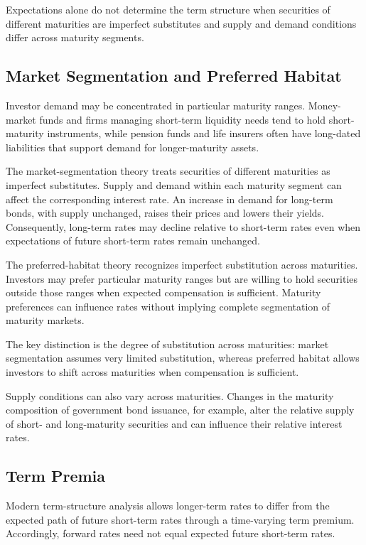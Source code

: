 Expectations alone do not determine the term structure when securities of different maturities are imperfect substitutes and supply and demand conditions differ across maturity segments.

\subsection{Market Segmentation and Preferred Habitat}

Investor demand may be concentrated in particular maturity ranges. Money-market funds and firms managing short-term liquidity needs tend to hold short-maturity instruments, while pension funds and life insurers often have long-dated liabilities that support demand for longer-maturity assets.

The market-segmentation theory treats securities of different maturities as imperfect substitutes. Supply and demand within each maturity segment can affect the corresponding interest rate. An increase in demand for long-term bonds, with supply unchanged, raises their prices and lowers their yields. Consequently, long-term rates may decline relative to short-term rates even when expectations of future short-term rates remain unchanged.

The preferred-habitat theory recognizes imperfect substitution across maturities. Investors may prefer particular maturity ranges but are willing to hold securities outside those ranges when expected compensation is sufficient. Maturity preferences can influence rates without implying complete segmentation of maturity markets.

The key distinction is the degree of substitution across maturities: market segmentation assumes very limited substitution, whereas preferred habitat allows investors to shift across maturities when compensation is sufficient.

Supply conditions can also vary across maturities. Changes in the maturity composition of government bond issuance, for example, alter the relative supply of short- and long-maturity securities and can influence their relative interest rates.

\subsection{Term Premia}

Modern term-structure analysis allows longer-term rates to differ from the expected path of future short-term rates through a time-varying term premium. Accordingly, forward rates need not equal expected future short-term rates.

